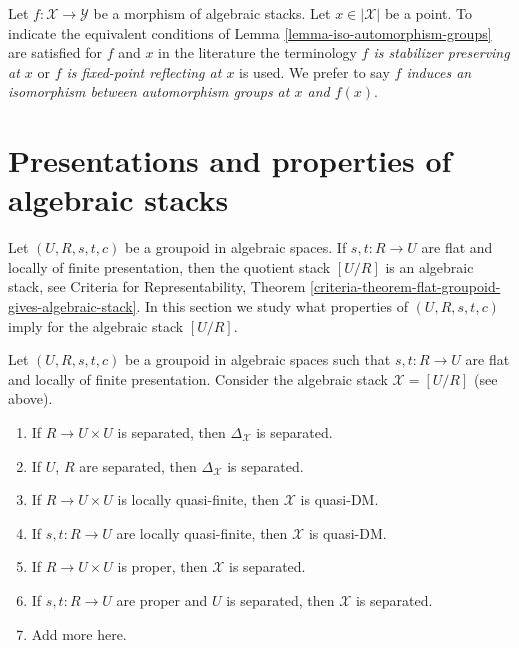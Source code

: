 \begin{remark}
\label{remark-identify-automorphism-groups}
Let $f : \mathcal{X} \to \mathcal{Y}$ be a morphism of algebraic stacks.
Let $x \in |\mathcal{X}|$ be a point. To indicate the equivalent
conditions of Lemma \ref{lemma-iso-automorphism-groups}
are satisfied for $f$ and $x$ in the literature the terminology
{\it $f$ is stabilizer preserving at $x$} or
{\it $f$ is fixed-point reflecting at $x$} is used.
We prefer to say {\it $f$ induces an isomorphism between
automorphism groups at $x$ and $f(x)$}.
\end{remark}





\section{Presentations and properties of algebraic stacks}
\label{section-presentations-properties}

\noindent
Let $(U, R, s, t, c)$ be a groupoid in algebraic spaces.
If $s, t : R \to U$ are flat and locally of finite presentation,
then the quotient stack $[U/R]$ is an algebraic stack, see
Criteria for Representability, Theorem
\ref{criteria-theorem-flat-groupoid-gives-algebraic-stack}.
In this section we study what properties of $(U, R, s, t, c)$
imply for the algebraic stack $[U/R]$.

\begin{lemma}
\label{lemma-properties-diagonal-from-presentation}
Let $(U, R, s, t, c)$ be a groupoid in algebraic spaces such that
$s, t : R \to U$ are flat and locally of finite presentation.
Consider the algebraic stack $\mathcal{X} = [U/R]$ (see above).
\begin{enumerate}
\item If $R \to U \times U$ is separated, then
$\Delta_\mathcal{X}$ is separated.
\item If $U$, $R$ are separated, then $\Delta_\mathcal{X}$ is separated.
\item If $R \to U \times U$ is locally quasi-finite, then $\mathcal{X}$
is quasi-DM.
\item If $s, t : R \to U$ are locally quasi-finite, then
$\mathcal{X}$ is quasi-DM.
\item If $R \to U \times U$ is proper, then $\mathcal{X}$ is separated.
\item If $s, t : R \to U$ are proper and $U$ is separated, then
$\mathcal{X}$ is separated.
\item Add more here.
\end{enumerate}
\end{lemma}

